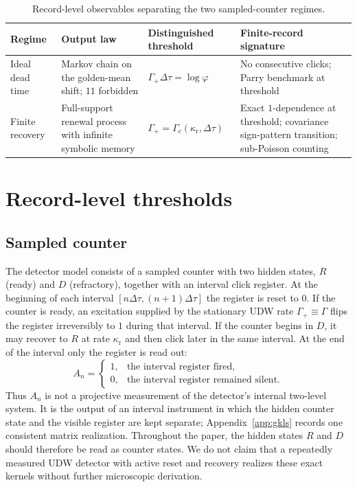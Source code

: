 \documentclass[11pt]{article}
\theoremstyle{definition}
\begin{document}
\begin{table}[t]
\centering
\small
\caption{Record-level observables separating the two sampled-counter regimes.}
\label{tab:signatures}
\begin{tabular}{>{\raggedright\arraybackslash}p{} >{\raggedright\arraybackslash}p{} >{\raggedright\arraybackslash}p{} >{\raggedright\arraybackslash}p{}}
\toprule
Regime & Output law & Distinguished threshold & Finite-record signature \\
\midrule
Ideal dead time & Markov chain on the golden-mean shift; $11$ forbidden & $\Gamma_+\Delta\tau=\log\varphi$ & No consecutive clicks; Parry benchmark at threshold \\
Finite recovery & Full-support renewal process with infinite symbolic memory & $\Gamma_+=\Gamma_c(\kappa_{\mathrm r},\Delta\tau)$ & Exact $1$-dependence at threshold; covariance sign-pattern transition; sub-Poisson counting \\
\bottomrule
\end{tabular}
\end{table}

\section{Record-level thresholds}\label{sec:records}

\subsection{Sampled counter}\label{subsec:phenom-model}
The detector model consists of a sampled counter with two hidden states, $R$ (ready) and $D$ (refractory), together with an interval click register. At the beginning of each interval $[n\Delta\tau,(n+1)\Delta\tau]$ the register is reset to $0$. If the counter is ready, an excitation supplied by the stationary UDW rate $\Gamma_+\equiv\Gamma$ flips the register irreversibly to $1$ during that interval. If the counter begins in $D$, it may recover to $R$ at rate $\kappa_{\mathrm r}$ and then click later in the same interval. At the end of the interval only the register is read out:
\[
A_n=
\begin{cases}
1,&\text{the interval register fired},\\
0,&\text{the interval register remained silent}.
\end{cases}
\]
Thus $A_n$ is not a projective measurement of the detector's internal two-level system. It is the output of an interval instrument in which the hidden counter state and the visible register are kept separate; Appendix~\ref{app:gkls} records one consistent matrix realization. Throughout the paper, the hidden states $R$ and $D$ should therefore be read as counter states. We do not claim that a repeatedly measured UDW detector with active reset and recovery realizes these exact kernels without further microscopic derivation.
\end{document}
